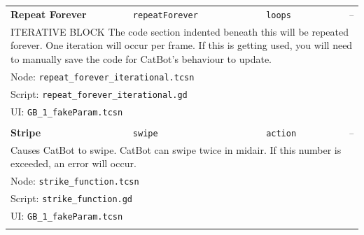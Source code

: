 \begin{center}
\begin{longtable}{lllr}
    \textbf{Repeat Forever}
    & \texttt{repeatForever}
    & \texttt{loops}
    & \textit{--}
    \\
    \multicolumn{4}{p{0.98\linewidth}}{
        ITERATIVE BLOCK
        The code section indented beneath this will be repeated forever.
        One iteration will occur per frame.
        If this is getting used, you will need to manually save the code for CatBot's behaviour to update.
    }
    \\ \multicolumn{4}{l}{Node: \texttt{repeat\_forever\_iterational.tcsn}}
    \\ \multicolumn{4}{l}{Script: \texttt{repeat\_forever\_iterational.gd}}
    \\ \multicolumn{4}{l}{UI: \texttt{GB\_1\_fakeParam.tcsn}}
    \\ \\

    \textbf{Stripe}
    & \texttt{swipe}
    & \texttt{action}
    & \textit{--}
    \\
    \multicolumn{4}{p{0.98\linewidth}}{
        Causes CatBot to swipe.
        CatBot can swipe twice in midair.
        If this number is exceeded, an error will occur.
    }
    \\ \multicolumn{4}{l}{Node: \texttt{strike\_function.tcsn}}
    \\ \multicolumn{4}{l}{Script: \texttt{strike\_function.gd}}
    \\ \multicolumn{4}{l}{UI: \texttt{GB\_1\_fakeParam.tcsn}}
    \\ \\
    \bottomrule
  \end{longtable}
\end{center}